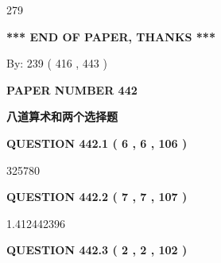 \documentclass{ctexart}
\begin{document}
  
 
 
\noindent{}

279
 
 
   
   
 \vspace{0.2in}
 
   
   
   
   
\vspace{1.0in} 
{\textbf{\large{ *** END OF PAPER, THANKS *** }}} 
   
   
\hspace{1.0in} By: 
 239 ( 416 ,  443 )
   
   
   
   
\newpage 
\setcounter{page}{ 
   442001 } 
   
   
   
   
 {\textbf{ \Large{ PAPER NUMBER  442  }}}
   
   
\vspace{0.2in}
   
   
   
   
   
   
 \vspace{0.2in}
{\LARGE {\textbf{ 八道算术和两个选择题}}}
   
   
  
\vspace{0.2in}
  
{\textbf{\Large{QUESTION
442.1 
 ( 6 , 6 , 106 )
}}}
  
  
 
 
\noindent{}

325780
 
 
  
\vspace{0.2in}
  
{\textbf{\Large{QUESTION
442.2 
 ( 7 , 7 , 107 )
}}}
  
  
 
 
\noindent{}

1.412442396
 
 
  
\vspace{0.2in}
  
{\textbf{\Large{QUESTION
442.3 
 ( 2 , 2 , 102 )
}}}
  
\end{document}
